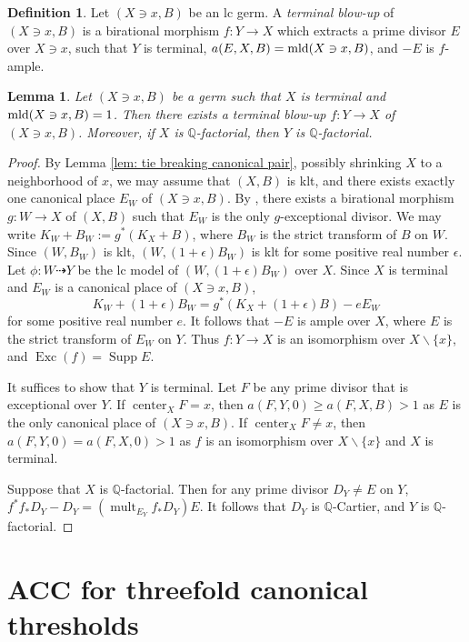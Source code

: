 \documentclass[11pt]{amsart}
\numberwithin{equation}{section}
\newcommand{\Qq}{\mathbb{Q}}
\newcommand{\Center}{\operatorname{center}}
\newcommand{\Exc}{\operatorname{Exc}}
\newcommand{\mld}{{\rm{mld}}}
\newcommand{\Supp}{\operatorname{Supp}}
\newcommand{\mult}{\operatorname{mult}}
\newtheorem{lem}[thm]{Lemma}
\theoremstyle{definition}
\theoremstyle{definition}
\newtheorem{defn}[thm]{Definition}
\begin{document}
\begin{defn}\label{defn: terminal blow-up}
Let $(X\ni x,B)$ be an lc germ. A \emph{terminal blow-up} of $(X\ni x,B)$ is a birational morphism $f: Y\rightarrow X$ which extracts a prime divisor $E$ over $X\ni x$, such that $Y$ is terminal, $a(E,X,B)=\mld(X\ni x,B)$, and $-E$ is $f$-ample. 
\end{defn}

\begin{lem}\label{lem: can extract divisor computing ct that is terminal strong version}
Let $(X\ni x, B)$ be a germ such that $X$ is terminal and $\mld(X\ni x, B)=1$. Then there exists a terminal blow-up $f: Y\to X$ of $(X\ni x,B)$. Moreover, if $X$ is $\Qq$-factorial, then $Y$ is $\Qq$-factorial.
\end{lem}

\begin{proof}
By Lemma \ref{lem: tie breaking canonical pair}, possibly shrinking $X$ to a neighborhood of $x$,  we may assume that $(X,B)$ is klt, and there exists exactly one canonical place $E_W$ of $(X\ni x,B)$. By \cite[Corollary~1.4.3]{BCHM10}, there exists a birational morphism $g: W\rightarrow X$ of $(X,B)$ such that $E_W$ is the only $g$-exceptional divisor. We may write $K_W+B_W:=g^*(K_X+B)$, where $B_W$ is the strict transform of $B$ on $W$. Since $(W,B_W)$ is klt, $(W,(1+\epsilon)B_W)$ is klt for some positive real number $\epsilon$. Let $\phi:W\dashrightarrow Y$ be the lc model of $(W,(1+\epsilon)B_W)$ over $X$. Since $X$ is terminal and $E_W$ is a canonical place of $(X\ni x,B)$,
$$K_W+(1+\epsilon)B_W=g^*(K_X+(1+\epsilon)B)-eE_W$$
 for some positive real number $e$. It follows that $-E$ is ample over $X$, where $E$ is the strict transform of $E_W$ on $Y$. Thus $f:Y\to X$ is an isomorphism over $X\backslash\{x\}$, and $\Exc(f)=\Supp E$.
 
It suffices to show that $Y$ is terminal. Let $F$ be any prime divisor that is exceptional over $Y$. If $\Center_{X}F=x$, then $a(F,Y,0)\ge a(F,X,B)>1$ as $E$ is the only canonical place of $(X\ni x,B)$. If $\Center_{X}F\neq x$, then $a(F,Y,0)=a(F,X,0)>1$ as $f$ is an isomorphism over $X\backslash\{x\}$ and $X$ is terminal. 

Suppose that $X$ is $\Qq$-factorial. Then for any prime divisor $D_Y\neq E$ on $Y$, $f^{*}f_{*}D_Y-D_Y=(\mult_{E_Y}f_{*}D_Y)E$. It follows that $D_Y$ is $\Qq$-Cartier, and $Y$ is $\Qq$-factorial.
\end{proof}




\section{ACC for threefold canonical thresholds}\label{section: ACC for threefold canonical thresholds}
\end{document}

